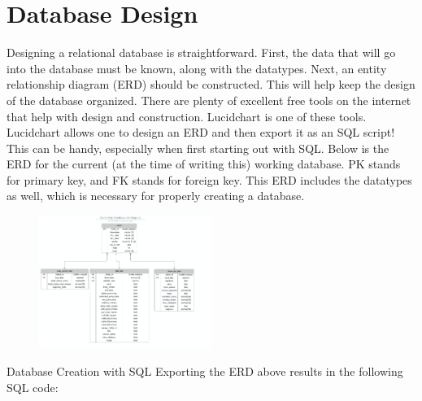 \documentclass[]{book}
\begin{document}
\section{Database Design}\label{database-design}

Designing a relational database is straightforward. First, the data that
will go into the database must be known, along with the datatypes. Next,
an entity relationship diagram (ERD) should be constructed. This will
help keep the design of the database organized. There are plenty of
excellent free tools on the internet that help with design and
construction. Lucidchart is one of these tools. Lucidchart allows one to
design an ERD and then export it as an SQL script! This can be handy,
especially when first starting out with SQL. Below is the ERD for the
current (at the time of writing this) working database. PK stands for
primary key, and FK stands for foreign key. This ERD includes the
datatypes as well, which is necessary for properly creating a database.

\begin{figure}
\centering
\includegraphics[width=0.50000\textwidth]{./images/entity.png}
\caption{}
\end{figure}

Database Creation with SQL Exporting the ERD above results in the
following SQL code:
\end{document}
